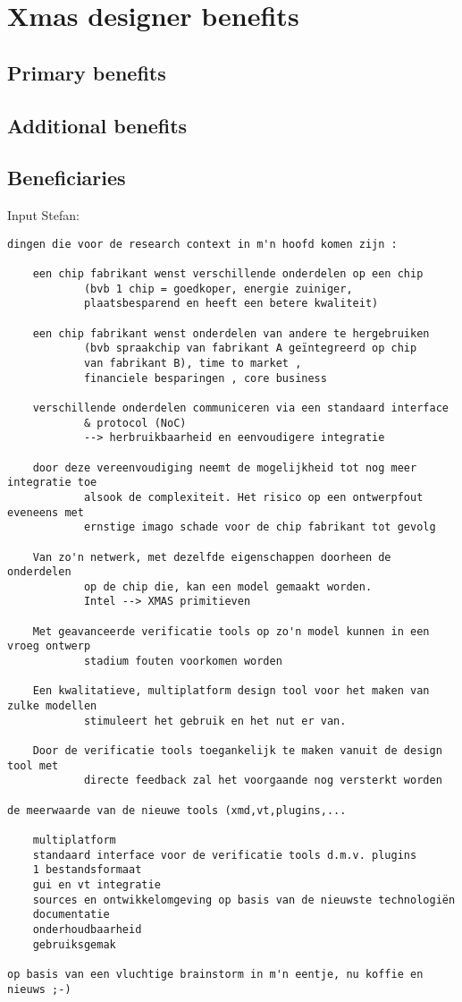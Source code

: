 \section{Xmas designer benefits}
\subsection{Primary benefits}
\subsection{Additional benefits}
\subsection{Beneficiaries}

Input Stefan:
{\small
\begin{lstlisting}
dingen die voor de research context in m'n hoofd komen zijn :

    een chip fabrikant wenst verschillende onderdelen op een chip 
    		(bvb 1 chip = goedkoper, energie zuiniger, 
    		plaatsbesparend en heeft een betere kwaliteit)

    een chip fabrikant wenst onderdelen van andere te hergebruiken 
    		(bvb spraakchip van fabrikant A geïntegreerd op chip 
    		van fabrikant B), time to market , 
    		financiele besparingen , core business

    verschillende onderdelen communiceren via een standaard interface 
    		& protocol (NoC) 
    		--> herbruikbaarheid en eenvoudigere integratie

    door deze vereenvoudiging neemt de mogelijkheid tot nog meer integratie toe 
    		alsook de complexiteit. Het risico op een ontwerpfout eveneens met 
    		ernstige imago schade voor de chip fabrikant tot gevolg

    Van zo'n netwerk, met dezelfde eigenschappen doorheen de onderdelen 
    		op de chip die, kan een model gemaakt worden. 
    		Intel --> XMAS primitieven
    		
    Met geavanceerde verificatie tools op zo'n model kunnen in een vroeg ontwerp 
    		stadium fouten voorkomen worden
    		
    Een kwalitatieve, multiplatform design tool voor het maken van zulke modellen 
    		stimuleert het gebruik en het nut er van.
    		
    Door de verificatie tools toegankelijk te maken vanuit de design tool met 
    		directe feedback zal het voorgaande nog versterkt worden

de meerwaarde van de nieuwe tools (xmd,vt,plugins,...

    multiplatform
    standaard interface voor de verificatie tools d.m.v. plugins
    1 bestandsformaat
    gui en vt integratie
    sources en ontwikkelomgeving op basis van de nieuwste technologiën
    documentatie 
    onderhoudbaarheid
    gebruiksgemak

op basis van een vluchtige brainstorm in m'n eentje, nu koffie en nieuws ;-)
\end{lstlisting}
}